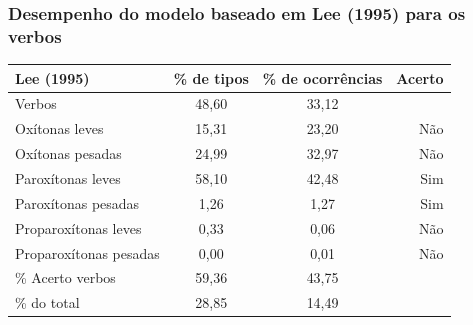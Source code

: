 \documentclass[xcolor=table]{beamer}
\begin{document}
	\begin{frame}
		\frametitle{Desempenho do modelo baseado em Lee (1995) para os verbos}
		\begin{table}[H]
			\centering
			\label{TAB28}
			\begin{tabular}{@{}lccr@{}}
				\toprule
				\textbf{Lee (1995)}            &\textbf{ \% de tipos}   & \textbf{\% de ocorrências} & \textbf{Acerto} \\ \midrule
				Verbos                & 48,60       & 33,12           &        \\
				Oxítonas leves                & 15,31       & 23,20           & Não      \\
				Oxítonas pesadas                & 24,99       & 32,97           & Não      \\
				\rowcolor[HTML]{656565} 
				Paroxítonas leves               & 58,10       & 42,48           & Sim      \\
				\rowcolor[HTML]{656565} 
				Paroxítonas pesadas               & 1,26        & 1,27            & Sim      \\
				Proparoxítonas leves                & 0,33        & 0,06            & Não      \\
				Proparoxítonas pesadas                & 0,00        & 0,01            & Não      \\
				\% Acerto verbos          & 59,36       & 43,75           &        \\
				\% do total           & 28,85       & 14,49           &        \\
			\end{tabular}
		\end{table}
	\end{frame}
\end{document}
